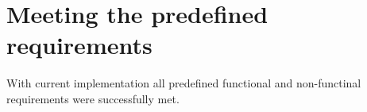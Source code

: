\section{Meeting the predefined requirements}

With current implementation all predefined functional and non-functinal requirements were successfully met.